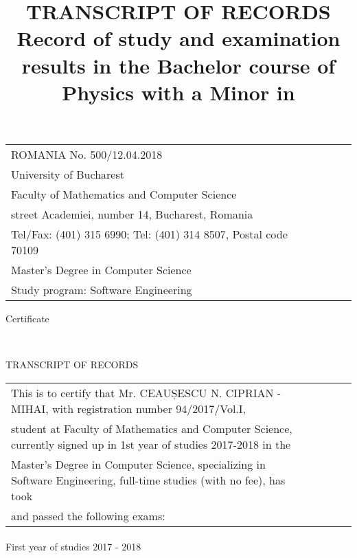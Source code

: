 \documentclass[a4paper,9pt,final]{scrartcl}
\title{\textbf{TRANSCRIPT OF RECORDS}\\[0.5em]
Record of study and examination results in the
Bachelor course of Physics
with a Minor in \ergfach}
\author{}
\begin{document}

\begin{tabular}{llcll}
	
	ROMANIA \hspace{35em} No. 500/12.04.2018 \\
	University of Bucharest \\
	Faculty of Mathematics and Computer Science \\
	street Academiei, number 14, Bucharest, Romania \\
	Tel/Fax: (401) 315 6990; Tel: (401) 314 8507, Postal code 70109 \\
	Master's Degree in Computer Science \\
	Study program: Software Engineering\\
	
\end{tabular}
	\vspace{3em}
\begin{center}
	\begin{Large}Certificate\end{Large} 
	\\
	\vspace{1em}
	\begin{Large}TRANSCRIPT OF RECORDS\end{Large}
	\vspace{3em}	
\end{center}

\begin{tabular}{llcll}
\hspace{3em}This is to certify that Mr. CEAUȘESCU N. CIPRIAN - MIHAI, with registration number 94/2017/Vol.I,\\ student at 
Faculty of Mathematics and Computer Science, currently signed up in 1st year of studies 2017-2018 in the \\ Master's Degree in Computer Science, specializing in Software Engineering, full-time studies (with no fee), has took \\ and passed the following exams:

\end{tabular}
\paragraph{}
First year of studies 2017 - 2018
\end{document}
